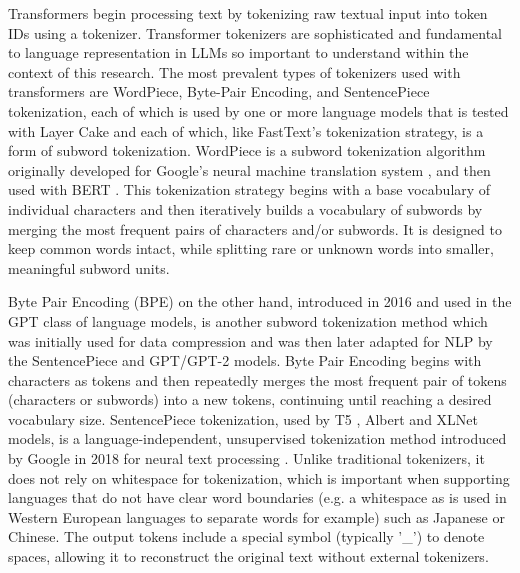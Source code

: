 \documentclass[final]{clv2025-revised}
\begin{document}
Transformers begin processing text by tokenizing raw textual input into token IDs using a tokenizer. Transformer tokenizers are sophisticated and fundamental to language representation in LLMs so important to understand within the context of this research. The most prevalent types of tokenizers used with transformers are WordPiece, Byte-Pair Encoding, and SentencePiece tokenization, each of which is used by one or more language models that is tested with Layer Cake and each of which, like FastText's tokenization strategy, is a form of subword tokenization. WordPiece is a subword tokenization algorithm originally developed for Google's neural machine translation system \cite{schuster} \cite{wu}, and then used with BERT \cite{devlin-etal-2019-bert}. This tokenization strategy begins with a base vocabulary of individual characters and then iteratively builds a vocabulary of subwords by merging the most frequent pairs of characters and/or subwords. It is designed to keep common words intact, while splitting rare or unknown words into smaller, meaningful subword units. 

Byte Pair Encoding (BPE) on the other hand, introduced in 2016 \cite{sennrich-etal-2016-neural} and used in the GPT class of language models, is another subword tokenization method which was initially used for data compression and was then later adapted for NLP by the SentencePiece and GPT/GPT-2 models. Byte Pair Encoding begins with characters as tokens and then repeatedly merges the most frequent pair of tokens (characters or subwords) into a new tokens, continuing until reaching a desired vocabulary size. SentencePiece tokenization, used by T5 \cite{raffel2019exploring}, Albert \cite{lan2019albert} and XLNet \cite{yang2019xlnet} models, is a language-independent, unsupervised tokenization method introduced by Google in 2018 for neural text processing \cite{kudo2018sentencepiece}. Unlike traditional tokenizers, it does not rely on whitespace for tokenization, which is important when supporting languages that do not have clear word boundaries (e.g. a whitespace as is used in Western European languages to separate words for example) such as Japanese or Chinese. The output tokens include a special symbol (typically '\_') to denote spaces, allowing it to reconstruct the original text without external tokenizers.
\end{document}
